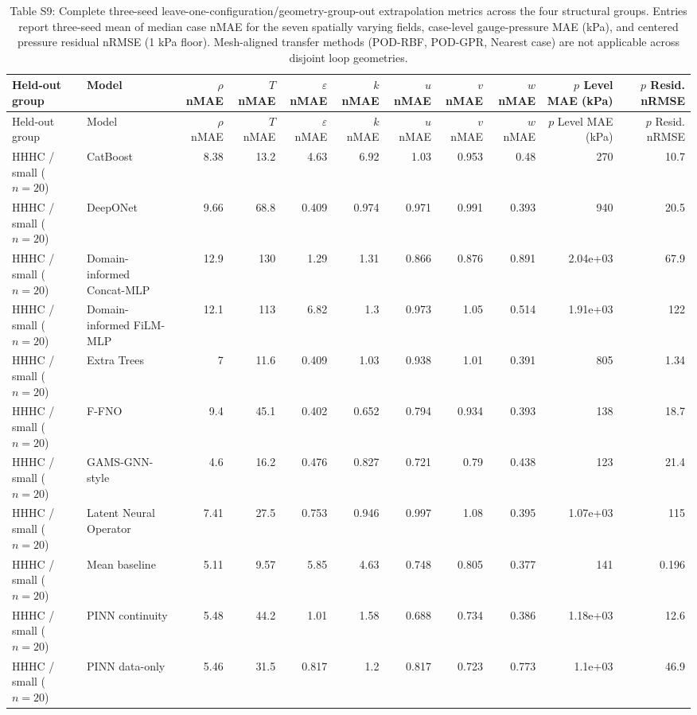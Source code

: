 \begin{landscape}\scriptsize
\begin{longtable}{p{2.8cm}p{3.6cm}rrrrrrrrr}
\caption{Table S9: Complete three-seed leave-one-configuration/geometry-group-out extrapolation metrics across the four structural groups. Entries report three-seed mean of median case nMAE for the seven spatially varying fields, case-level gauge-pressure MAE (kPa), and centered pressure residual nRMSE (1 kPa floor). Mesh-aligned transfer methods (POD-RBF, POD-GPR, Nearest case) are not applicable across disjoint loop geometries.}\\
\toprule Held-out group & Model & $\rho$ nMAE & $T$ nMAE & $\varepsilon$ nMAE & $k$ nMAE & $u$ nMAE & $v$ nMAE & $w$ nMAE & $p$ Level MAE (kPa) & $p$ Resid. nRMSE\\
\midrule\endfirsthead
\toprule Held-out group & Model & $\rho$ nMAE & $T$ nMAE & $\varepsilon$ nMAE & $k$ nMAE & $u$ nMAE & $v$ nMAE & $w$ nMAE & $p$ Level MAE (kPa) & $p$ Resid. nRMSE\\
\midrule\endhead
HHHC / small ($n=20$) & CatBoost & 8.38 & 13.2 & 4.63 & 6.92 & 1.03 & 0.953 & 0.48 & 270 & 10.7 \\
HHHC / small ($n=20$) & DeepONet & 9.66 & 68.8 & 0.409 & 0.974 & 0.971 & 0.991 & 0.393 & 940 & 20.5 \\
HHHC / small ($n=20$) & Domain-informed Concat-MLP & 12.9 & 130 & 1.29 & 1.31 & 0.866 & 0.876 & 0.891 & 2.04e+03 & 67.9 \\
HHHC / small ($n=20$) & Domain-informed FiLM-MLP & 12.1 & 113 & 6.82 & 1.3 & 0.973 & 1.05 & 0.514 & 1.91e+03 & 122 \\
HHHC / small ($n=20$) & Extra Trees & 7 & 11.6 & 0.409 & 1.03 & 0.938 & 1.01 & 0.391 & 805 & 1.34 \\
HHHC / small ($n=20$) & F-FNO & 9.4 & 45.1 & 0.402 & 0.652 & 0.794 & 0.934 & 0.393 & 138 & 18.7 \\
HHHC / small ($n=20$) & GAMS-GNN-style & 4.6 & 16.2 & 0.476 & 0.827 & 0.721 & 0.79 & 0.438 & 123 & 21.4 \\
HHHC / small ($n=20$) & Latent Neural Operator & 7.41 & 27.5 & 0.753 & 0.946 & 0.997 & 1.08 & 0.395 & 1.07e+03 & 115 \\
HHHC / small ($n=20$) & Mean baseline & 5.11 & 9.57 & 5.85 & 4.63 & 0.748 & 0.805 & 0.377 & 141 & 0.196 \\
HHHC / small ($n=20$) & PINN continuity & 5.48 & 44.2 & 1.01 & 1.58 & 0.688 & 0.734 & 0.386 & 1.18e+03 & 12.6 \\
HHHC / small ($n=20$) & PINN data-only & 5.46 & 31.5 & 0.817 & 1.2 & 0.817 & 0.723 & 0.773 & 1.1e+03 & 46.9 \\

\end{longtable}
\end{landscape}
